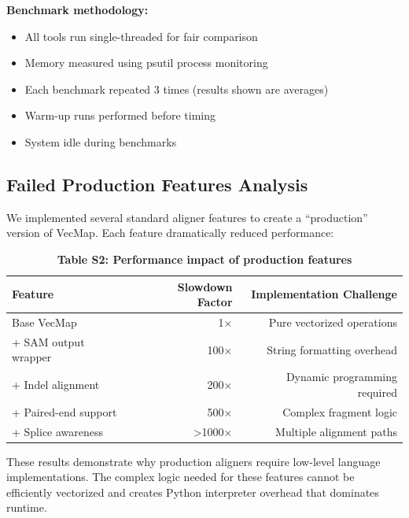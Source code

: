 \documentclass[12pt]{article}
\begin{document}
\textbf{Benchmark methodology:}
\begin{itemize}
\item All tools run single-threaded for fair comparison
\item Memory measured using psutil process monitoring
\item Each benchmark repeated 3 times (results shown are averages)
\item Warm-up runs performed before timing
\item System idle during benchmarks
\end{itemize}

\subsection*{Failed Production Features Analysis}

We implemented several standard aligner features to create a ``production'' version of VecMap. Each feature dramatically reduced performance:

\begin{table}[H]
\centering
\caption{\textbf{Table S2: Performance impact of production features}}
\begin{tabular}{lrr}
\toprule
\textbf{Feature} & \textbf{Slowdown Factor} & \textbf{Implementation Challenge} \\
\midrule
Base VecMap & 1× & Pure vectorized operations \\
+ SAM output wrapper & 100× & String formatting overhead \\
+ Indel alignment & 200× & Dynamic programming required \\
+ Paired-end support & 500× & Complex fragment logic \\
+ Splice awareness & >1000× & Multiple alignment paths \\
\bottomrule
\end{tabular}
\end{table}

These results demonstrate why production aligners require low-level language implementations. The complex logic needed for these features cannot be efficiently vectorized and creates Python interpreter overhead that dominates runtime.
\end{document}
